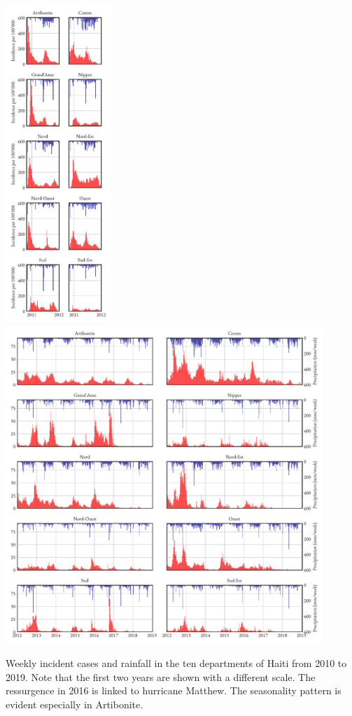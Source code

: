 \begin{fwfigure}
	\centering
	\includegraphics[height=12cm,keepaspectratio]{fig_cholera-haiti-ocv/haiti-2010.pdf}
		\includegraphics[height=12cm,keepaspectratio]{fig_cholera-haiti-ocv/haiti-2012.pdf}
	\caption[Incident cholera cases and rainfall in Haiti from 2010 to 2019]{Weekly incident cases and rainfall in the ten departments of Haiti from 2010 to 2019. Note that the first two years are shown with a different scale. The ressurgence in 2016 is linked to hurricane Matthew\parencites{Pasetto:RealtimeForecastingCholera:2018}. The seasonality pattern is evident especially in Artibonite.}
	\label{fig:data2}
\end{fwfigure}
